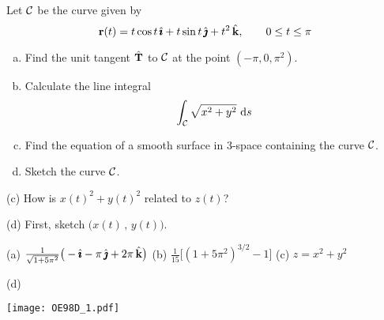 \begin{question}[M317 1998D] %
	Let $\mathcal{C}$ be the curve given by 
	$$
	\mathbf{r}(t)=t\cos t\,\hat{\pmb{\imath}}+t\sin t\,\hat{\pmb{\jmath}}+t^2\,\hat{\mathbf{k}},\qquad 0\le t\le \pi
	$$
	\begin{enumerate}[(a)]
		\item
		Find the unit tangent $\hat{\mathbf{T}}$ to $\mathcal{C}$ at the point $(-\pi,0,\pi^2)$.
		\item
		Calculate the line integral
		$$
		\int_{\mathcal{C}} \sqrt{x^2+y^2}\ \mathrm{d}s
		$$
		\item
		Find the equation of a smooth surface in $3$-space containing
		the curve $\mathcal{C}$.
		\item
		Sketch the curve $\mathcal{C}$.
	\end{enumerate}
\end{question}

\begin{hint} 
	(c) How is $x(t)^2+y(t)^2$ related to $z(t)$?
	
	(d) First, sketch $\big(x(t)\,,\,y(t)\big)$.
	
\end{hint}

\begin{answer} 
	(a) $\frac{1}{\sqrt{1+5\pi^2}}\big(-\hat{\pmb{\imath}}-\pi\,\hat{\pmb{\jmath}}+2\pi\,\hat{\mathbf{k}}\big)$\qquad
	(b) $\frac{1}{15}\big[(1+5\pi^2)^{3/2}-1\big]$\qquad
	(c) $z=x^2+y^2$
	
	(d) 
	\begin{center}
		\texttt{[image: OE98D\_1.pdf]}
	\end{center}
	
\end{answer}

